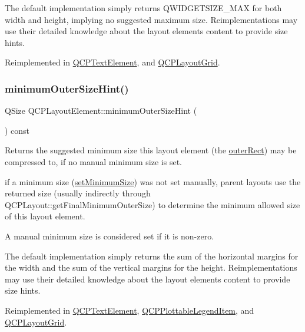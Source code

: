 The default implementation simply returns {\ttfamily Q\+W\+I\+D\+G\+E\+T\+S\+I\+Z\+E\+\_\+\+M\+AX} for both width and height, implying no suggested maximum size. Reimplementations may use their detailed knowledge about the layout element\textquotesingle{}s content to provide size hints. 

Reimplemented in \hyperlink{classQCPTextElement_ae82475b50c10a5b3314d996d50ae536b}{Q\+C\+P\+Text\+Element}, and \hyperlink{classQCPLayoutGrid_a41ce0014c220d77b909e2ca937f0e599}{Q\+C\+P\+Layout\+Grid}.

\mbox{\label{classQCPLayoutElement_a46789036c4fcb190fa374f91321d7c09}} 
\subsubsection{\texorpdfstring{minimum\+Outer\+Size\+Hint()}{minimumOuterSizeHint()}}
{\footnotesize\ttfamily Q\+Size Q\+C\+P\+Layout\+Element\+::minimum\+Outer\+Size\+Hint (\begin{DoxyParamCaption}{ }\end{DoxyParamCaption}) const\hspace{0.3cm}{\ttfamily [virtual]}}

Returns the suggested minimum size this layout element (the \hyperlink{classQCPLayoutElement_a2a32a12a6161c9dffbadeb9cc585510c}{outer\+Rect}) may be compressed to, if no manual minimum size is set.

if a minimum size (\hyperlink{classQCPLayoutElement_a5dd29a3c8bc88440c97c06b67be7886b}{set\+Minimum\+Size}) was not set manually, parent layouts use the returned size (usually indirectly through Q\+C\+P\+Layout\+::get\+Final\+Minimum\+Outer\+Size) to determine the minimum allowed size of this layout element.

A manual minimum size is considered set if it is non-\/zero.

The default implementation simply returns the sum of the horizontal margins for the width and the sum of the vertical margins for the height. Reimplementations may use their detailed knowledge about the layout element\textquotesingle{}s content to provide size hints. 

Reimplemented in \hyperlink{classQCPTextElement_a47b8541f55ff520c557e0f27461f109e}{Q\+C\+P\+Text\+Element}, \hyperlink{classQCPPlottableLegendItem_a8b543f3ac32b2fe59326e01c1101b3b8}{Q\+C\+P\+Plottable\+Legend\+Item}, and \hyperlink{classQCPLayoutGrid_a0438bc58b4d3894d01db95b08d4268df}{Q\+C\+P\+Layout\+Grid}.

